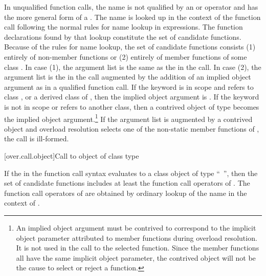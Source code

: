 \pnum
In unqualified function calls, the name is not qualified by an
\tcode{->}
or
operator and has the more general form of a
.
The name is looked up in the context of the function
call following the normal rules for name lookup
in expressions.
The function declarations found by that lookup constitute the
set of candidate functions.
Because of the rules for name lookup, the set of candidate functions
consists (1) entirely of non-member functions or (2) entirely of
member functions of some class
.
In case (1),
the argument list is
the same as the
in the call.
In case (2), the argument list is the
in the call augmented by the addition of an implied object
argument as in a qualified function call.
If the keyword
 is in scope and refers to
class
,
or a derived class of
,
then the implied object argument is
.
If the keyword
is not in
scope or refers to another class, then
a contrived object of type
becomes the implied object
argument.\footnote{An implied object argument must be contrived to
correspond to the implicit object
parameter attributed to member functions during overload resolution.
It is not
used in
the call to the selected function.
Since the member functions all have the
same implicit
object parameter, the contrived object will not be the cause to select or
reject a
function.}
If the argument list is augmented by a contrived object and overload
resolution selects one of the non-static member functions of
,
the call is ill-formed.

[over.call.object]{Call to object of class type}

\pnum
If the
in the function call syntax evaluates
to a class object of type ``\cv{}~'',
then the set of candidate
functions includes at least the function call operators of
.
The
function call operators of
are obtained by ordinary lookup of
the name
in the context of
.

